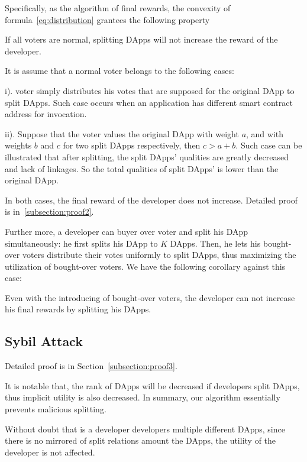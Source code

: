 Specifically, as the algorithm of final rewards, the convexity of formula~\ref{eq:distribution} grantees the following property
\begin{property}
	\label{p2}
    If all voters are normal, splitting DApps will not increase the reward of the developer.
\end{property}
It is assume that a normal voter belongs to the following cases:
\begin{inparaenum}
\item[i).] voter simply distributes his votes that are supposed for the original DApp to split DApps. Such case occurs when an application has different smart contract address for invocation.
\item[ii).] Suppose that the voter values the original DApp with weight $a$, and with weights $b$ and $c$ for two split DApps respectively, then $c>a+b$. Such case can be illustrated that after splitting, the split DApps' qualities are greatly decreased and lack of linkages. So the total qualities of split DApps' is lower than the original DApp.
 \end{inparaenum}

  In both cases, the final reward of the developer does not increase. Detailed proof  is in~\ref{subsection:proof2}.

Further more, a developer can buyer over voter and split his DApp simultaneously: he first splits his DApp to $K$ DApps. Then, he lets his bought-over voters distribute their votes uniformly to split DApps, thus  maximizing the utilization of  bought-over  voters. We have the following corollary against this case:
\begin{corollary}
	\label{c1}
	Even with the introducing of bought-over voters, the developer can not increase his final rewards by splitting his DApps.
\end{corollary}
\subsection{Sybil Attack}
Detailed proof is in Section~\ref{subsection:proof3}.

It is notable that, the rank of DApps will be decreased if developers split DApps, thus implicit utility is also decreased. In summary, our algorithm essentially prevents malicious splitting.

Without doubt that is a developer developers multiple different  DApps, since there is no mirrored of split relations amount the DApps, the utility of the developer is not affected.

